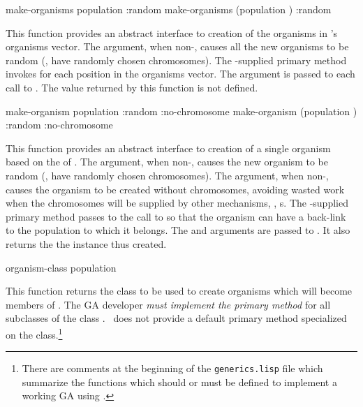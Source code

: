 {\filbreak

{\samepage
\Defgeneric make-organisms {population \key :random}
 make-organisms {(population ) \key :random}

This function provides an abstract interface to creation of the organisms in
's organisms vector. The  argument, when
non-, causes all the new organisms to be random (\ie, have randomly
chosen chromosomes). The \geco-supplied primary method invokes
 for each position in the organisms vector. The
 argument is passed to each call to .
The value returned by this function is not defined.
\par}%

\filbreak

{\samepage
\Defgeneric make-organism {population \key :random :no-chromosome}
 make-organism {(population ) \key :random :no-chromosome}
	\label{method:make-organism}

This function provides an abstract interface to creation of a single organism
based on the  of . The 
argument, when non-, causes the new organism to be random (\ie, have
randomly chosen chromosomes). The  argument, when
non-, causes the organism to be created without chromosomes, avoiding
wasted work when the chromosomes will be supplied by other mechanisms, \eg,
s. The \geco-supplied primary method passes  to
the call to  so that the organism can have a back-link
to the population to which it belongs. The  and
 arguments are passed to .
It also returns the the  instance thus created.
\par}%

\filbreak

{\samepage
\Defgeneric organism-class {population}

This function returns the class to be used to create organisms which will become members
of . The GA developer {\em must implement the primary method} for all
subclasses of the class . \Geco\ does not provide a default primary method
specialized on the  class.\footnote{There are comments at the beginning
of the {\tt generics.lisp} file which summarize the functions which should or must be
defined to implement a working GA using \geco.}
\par}%

}
